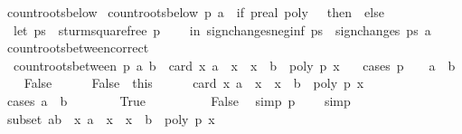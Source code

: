 \begin{isabellebody}
\isanewline
{}\isamarkupfalse%
\ count{\isacharunderscore}roots{\isacharunderscore}below\ \isanewline
{\isachardoublequoteopen}count{\isacharunderscore}roots{\isacharunderscore}below\ p\ a\ {\isacharequal}\ {\isacharparenleft}if\ {\isacharparenleft}p{\isacharcolon}{\isacharcolon}real\ poly{\isacharparenright}\ {\isacharequal}\ {}\ then\ {}\ else\isanewline
\ \ {\isacharparenleft}let\ ps\ {\isacharequal}\ sturm{\isacharunderscore}squarefree\ p\isanewline
\ \ \ \ in\ sign{\isacharunderscore}changes{\isacharunderscore}neg{\isacharunderscore}inf\ ps\ {\isacharminus}\ sign{\isacharunderscore}changes\ ps\ a{\isacharparenright}{\isacharparenright}{\isachardoublequoteclose}\isanewline
\isanewline
\isanewline
{}\isamarkupfalse%
\ count{\isacharunderscore}roots{\isacharunderscore}between{\isacharunderscore}correct{\isacharcolon}\isanewline
\ \ {\isachardoublequoteopen}count{\isacharunderscore}roots{\isacharunderscore}between\ p\ a\ b\ {\isacharequal}\ card\ {\isacharbraceleft}x{\isachardot}\ a\ {\isacharless}\ x\ {\isasymand}\ x\ {\isasymle}\ b\ {\isasymand}\ poly\ p\ x\ {\isacharequal}\ {}{\isacharbraceright}{\isachardoublequoteclose}\isanewline
%
\isadelimproof
%
\endisadelimproof
%
\isatagproof
{}\isamarkupfalse%
\ {\isacharparenleft}cases\ {\isachardoublequoteopen}p\ {\isasymnoteq}\ {}\ {\isasymand}\ a\ {\isasymle}\ b{\isachardoublequoteclose}{\isacharparenright}\isanewline
\ \ \isamarkupfalse%
\ False\isanewline
\ \ \ \ \isamarkupfalse%
\ False{\isacharprime}\ {\isacharequal}\ this\isanewline
\ \ \ \ \isamarkupfalse%
\ {\isachardoublequoteopen}card\ {\isacharbraceleft}x{\isachardot}\ a\ {\isacharless}\ x\ {\isasymand}\ x\ {\isasymle}\ b\ {\isasymand}\ poly\ p\ x\ {\isacharequal}\ {}{\isacharbraceright}\ {\isacharequal}\ {}{\isachardoublequoteclose}\isanewline
\ \ \ \ \isamarkupfalse%
\ {\isacharparenleft}cases\ {\isachardoublequoteopen}a\ {\isacharless}\ b{\isachardoublequoteclose}{\isacharparenright}\isanewline
\ \ \ \ \ \ \isamarkupfalse%
\ True\isanewline
\ \ \ \ \ \ \ \ \isamarkupfalse%
\ False\ \isamarkupfalse%
\ {\isacharbrackleft}simp{\isacharbrackright}{\isacharcolon}\ {\isachardoublequoteopen}p\ {\isacharequal}\ {}{\isachardoublequoteclose}\ \isamarkupfalse%
\ simp\isanewline
\ \ \ \ \ \ \ \ \isamarkupfalse%
\ subset{\isacharcolon}\ {\isachardoublequoteopen}{\isacharbraceleft}a{\isacharless}{\isachardot}{\isachardot}{\isacharless}b{\isacharbraceright}\ {\isasymsubseteq}\ {\isacharbraceleft}x{\isachardot}\ a\ {\isacharless}\ x\ {\isasymand}\ x\ {\isasymle}\ b\ {\isasymand}\ poly\ p\ x\ {\isacharequal}\ {}{\isacharbraceright}{\isachardoublequoteclose}\ \isamarkupfalse%

\end{isabellebody}
